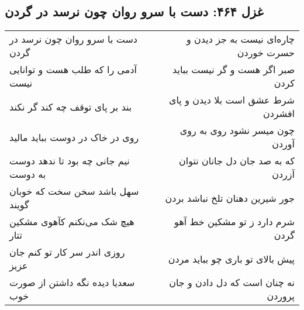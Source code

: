 \begin{center}
\section*{غزل ۴۶۴: دست با سرو روان چون نرسد در گردن}
\label{sec:464}
\begin{longtable}{l p{0.5cm} r}
دست با سرو روان چون نرسد در گردن
&&
چاره‌ای نیست به جز دیدن و حسرت خوردن
\\
آدمی را که طلب هست و توانایی نیست
&&
صبر اگر هست و گر نیست بباید کردن
\\
بند بر پای توقف چه کند گر نکند
&&
شرط عشق است بلا دیدن و پای افشردن
\\
روی در خاک در دوست بباید مالید
&&
چون میسر نشود روی به روی آوردن
\\
نیم جانی چه بود تا ندهد دوست به دوست
&&
که به صد جان دل جانان نتوان آزردن
\\
سهل باشد سخن سخت که خوبان گویند
&&
جور شیرین دهنان تلخ نباشد بردن
\\
هیچ شک می‌نکنم کآهوی مشکین تتار
&&
شرم دارد ز تو مشکین خط آهو گردن
\\
روزی اندر سر کار تو کنم جان عزیز
&&
پیش بالای تو باری چو بباید مردن
\\
سعدیا دیده نگه داشتن از صورت خوب
&&
نه چنان است که دل دادن و جان پروردن
\\
\end{longtable}
\end{center}
